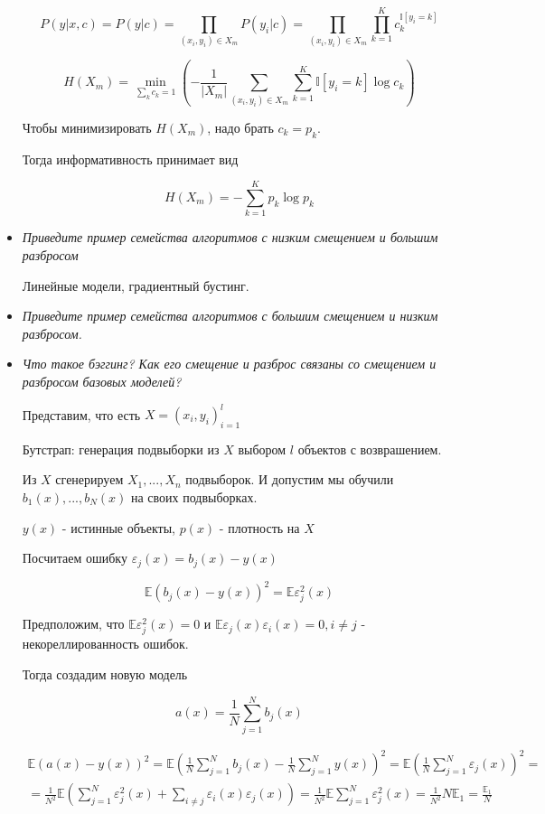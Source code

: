 \documentclass[12pt]{article}
\begin{document}
\begin{itemize}
\[ P(y|x, c) = P(y|c) = \prod_{(x_i, y_i) \in X_m} P(y_i|c) = \prod_{(x_i, y_i) \in X_m} \prod_{k=1}^K c_k^{\mathbb{I}[y_i=k]}\]

\[ H(X_m) = \min_{\sum_k c_k = 1} \left( -\frac{1}{|X_m|} \sum_{(x_i, y_i) \in X_m} \sum_{k=1}^K \mathbb{I} [y_i = k] \log c_k \right)\]

Чтобы минимизировать $H(X_m)$, надо брать $c_k = p_k$.

Тогда информативность принимает вид 

\[ H(X_m) = - \sum_{k=1}^K p_k \log p_k \]

\item \textit{Приведите пример семейства алгоритмов с низким смещением и большим разбросом}

Линейные модели, градиентный бустинг.

\item \textit{Приведите пример семейства алгоритмов с большим смещением и низким разбросом.}

\item \textit{Что такое бэггинг? Как его смещение и разброс связаны со смещением и разбросом
базовых моделей?}

Представим, что есть $X = (x_i, y_i)_{i=1}^l$

Бутстрап: генерация подвыборки из $X$ выбором $l$ объектов с возврашением.

Из $X$ сгенерируем $X_1, ..., X_n$ подвыборок. И допустим мы обучили $b_1(x), ..., b_N(x)$ на своих подвыборках.

$y(x)$ - истинные объекты, $p(x)$ - плотность на $X$

Посчитаем ошибку $\varepsilon_j(x) = b_j(x) - y(x)$

\[ \mathbb{E} (b_j(x) - y(x))^2 = \mathbb{E} \varepsilon_j^2(x) \]

Предположим, что $\mathbb{E} \varepsilon_j^2(x) = 0$ и $\mathbb{E} \varepsilon_j(x)  \varepsilon_i(x) = 0, i \neq j$ - некореллированность ошибок.

Тогда создадим новую модель

\[ a(x) = \frac{1}{N} \sum_{j=1}^N b_j(x) \]

\begin{equation}
\begin{gathered}
\mathbb{E} (a(x)-y(x))^2 = \mathbb{E} \left( \frac{1}{N} \sum_{j=1}^N b_j(x) - \frac{1}{N} \sum_{j=1}^N y(x) \right)^2 = \mathbb{E} \left( \frac{1}{N} \sum_{j=1}^N \varepsilon_j(x) \right)^2 = \\
= \frac{1}{N^2} \mathbb{E}\left( \sum_{j=1}^N \varepsilon_j^2(x) + \sum_{i \neq j} \varepsilon_i(x) \varepsilon_j(x)  \right) = \frac{1}{N^2} \mathbb{E} \sum_{j=1}^N \varepsilon_j^2(x) = \frac{1}{N^2} N \mathbb{E}_1 = \frac{\mathbb{E}_1}{N}
\end{gathered}
\end{equation}


\end{itemize}
\end{document}
